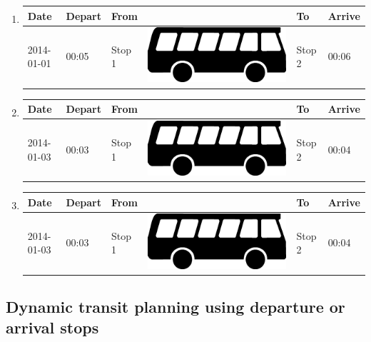 \documentclass[a4paper,11pt]{article}
\newcommand*{\bus}{\includegraphics[scale=0.02]{img/bus}}
\begin{document}
\begin{enumerate}
\begin{enumerate}
\item
{\scriptsize
\begin{tabular}{p{1.4cm} | p{.75cm} | p{2.1cm} c p{2.1cm} | p{.75cm} }
\hline
\rowcolor{Gray}
Date & Depart & From & & To & Arrive \\
\hline
2014-01-01 & 00:05 & Stop 1 & \bus & Stop 2 & 00:06 \\
\hline
\end{tabular}
}

\item
{\scriptsize
\begin{tabular}{p{1.4cm} | p{.75cm} | p{2.1cm} c p{2.1cm} | p{.75cm} }
\hline
\rowcolor{Gray}
Date & Depart & From & & To & Arrive \\
\hline
2014-01-03 & 00:03 & Stop 1 & \bus & Stop 2 & 00:04 \\
\hline
\end{tabular}
}

\item
{\scriptsize
\begin{tabular}{p{1.4cm} | p{.75cm} | p{2.1cm} c p{2.1cm} | p{.75cm} }
\hline
\rowcolor{Gray}
Date & Depart & From & & To & Arrive \\
\hline
2014-01-03 & 00:03 & Stop 1 & \bus & Stop 2 & 00:04 \\
\hline
\end{tabular}
}

\end{enumerate}
\end{enumerate}
\newpage


\subsection{Dynamic transit planning using departure or arrival stops}
\end{document}
